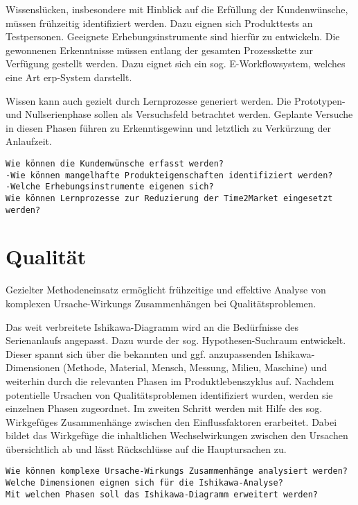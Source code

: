 Wissenslücken, insbesondere mit Hinblick auf die Erfüllung der Kundenwünsche, müssen frühzeitig identifiziert werden. Dazu eignen sich Produkttests an Testpersonen. Geeignete Erhebungsinstrumente sind hierfür zu entwickeln. Die gewonnenen Erkenntnisse müssen entlang der gesamten Prozesskette zur Verfügung gestellt werden. Dazu eignet sich ein sog. E-Workflowsystem, welches eine Art \gls{erp}-System darstellt. 

Wissen kann auch gezielt durch Lernprozesse generiert werden. Die Prototypen- und Nullserienphase sollen als Versuchsfeld betrachtet werden. Geplante Versuche in diesen Phasen führen zu Erkenntisgewinn und letztlich zu Verkürzung der Anlaufzeit. 

\begin{verbatim}
Wie können die Kundenwünsche erfasst werden? 
-Wie können mangelhafte Produkteigenschaften identifiziert werden? 
-Welche Erhebungsinstrumente eigenen sich?
Wie können Lernprozesse zur Reduzierung der Time2Market eingesetzt werden? 
\end{verbatim}

\section{Qualität}

Gezielter Methodeneinsatz ermöglicht frühzeitige und effektive Analyse von komplexen Ursache-Wirkungs %
Zusammenhängen bei Qualitätsproblemen. 

Das weit verbreitete Ishikawa-Diagramm wird an die Bedürfnisse des Serienanlaufs angepasst. Dazu wurde der sog. Hypothesen-Suchraum entwickelt. Dieser spannt sich über die bekannten und ggf. anzupassenden Ishikawa-Dimensionen (Methode, Material, Mensch, Messung, Milieu, Maschine) und weiterhin durch die relevanten Phasen im Produktlebenszyklus auf. Nachdem potentielle Ursachen  von Qualitätsproblemen identifiziert wurden, werden sie einzelnen Phasen zugeordnet. Im zweiten Schritt werden mit Hilfe des sog. Wirkgefüges Zusammenhänge zwischen den Einflussfaktoren erarbeitet. Dabei bildet das Wirkgefüge die inhaltlichen Wechselwirkungen zwischen den Ursachen übersichtlich ab und lässt Rückschlüsse auf die Hauptursachen zu.

\begin{verbatim}
Wie können komplexe Ursache-Wirkungs Zusammenhänge analysiert werden? 
Welche Dimensionen eignen sich für die Ishikawa-Analyse? 
Mit welchen Phasen soll das Ishikawa-Diagramm erweitert werden?
\end{verbatim}

